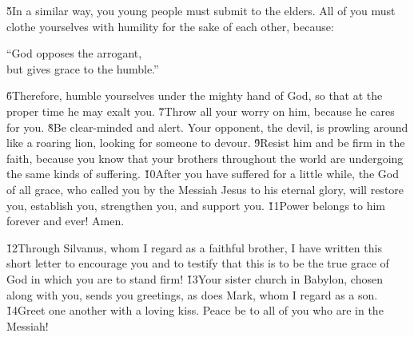 \v{5}In a similar way, you young people must submit to the elders. All of you must clothe yourselves with humility for the sake of each other, because:

\begin{poetry}
\poeml ``God opposes the arrogant, \\
\poemll    but gives grace to the humble.''
\end{poetry}

\v{6}Therefore, humble yourselves under the mighty hand of God, so that at the proper time he may exalt you. \v{7}Throw all your worry on him, because he cares for you. \v{8}Be clear-minded and alert. Your opponent, the devil, is prowling around like a roaring lion, looking for someone to devour. \v{9}Resist him and be firm in the faith, because you know that your brothers throughout the world are undergoing the same kinds of suffering. \v{10}After you have suffered for a little while, the God of all grace, who called you by the Messiah Jesus to his eternal glory, will restore you, establish you, strengthen you, and support you. \v{11}Power belongs to him forever and ever! Amen.

\v{12}Through Silvanus, whom I regard as a faithful brother, I have written this short letter to encourage you and to testify that this is to be the true grace of God in which you are to stand firm! \v{13}Your sister church in Babylon, chosen along with you, sends you greetings, as does Mark, whom I regard as a son. \v{14}Greet one another with a loving kiss. Peace be to all of you who are in the Messiah!
